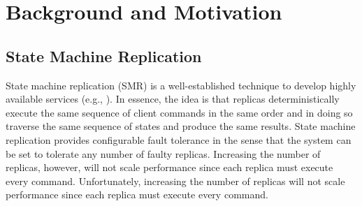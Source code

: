 

\section{Background and Motivation}




\subsection{State Machine Replication}

State machine replication (SMR) is a well-established technique to
develop highly available services (e.g.,
\cite{Shvachko:2003,Ghemawat:2003,Burrows:2006,MacCormick:2004}).  In
essence, the idea is that replicas deterministically execute the same
sequence of client commands in the same order and in doing so traverse
the same sequence of states and produce the same results.  State
machine replication provides configurable fault tolerance in the sense
that the system can be set to tolerate any number of faulty replicas.
Increasing the number of replicas, however, will not scale performance
since each replica must execute every command.  Unfortunately,
increasing the number of replicas will not scale performance since
each replica must execute every command.

